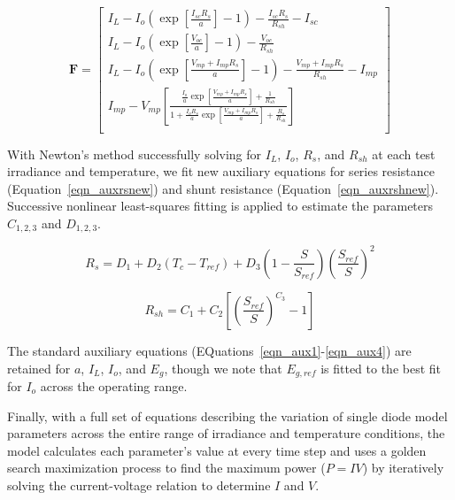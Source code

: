 \documentclass[12pt,letterpaper]{article}
\begin{document}
\begin{equation}
\mathbf{F} = \left[ \begin{array}{l} 
I_L - I_o\left(\exp\left[\frac{I_{sc}R_s}{a}\right]-1\right) - \frac{I_{sc}R_s}{R_{sh}} - I_{sc} \\ 

I_L - I_o\left(\exp \left[\frac{V_{oc}}{a}\right]-1\right) - \frac{V_{oc}}{R_{sh}} \\ 

I_L - I_o\left(\exp \left[\frac{V_{mp}+I_{mp}R_s}{a}\right]-1\right) - \frac{V_{mp}+I_{mp}R_s}{R_{sh}} - I_{mp} \\

I_{mp} - V_{mp}\left[ \frac{  \frac{I_o}{a}\exp\left[ \frac{V_{mp} + I_{mp}R_s}{a}\right] + \frac{1}{R_{sh}} } { 1  + \frac{I_o R_s}{a}\exp \left[ \frac{V_{mp} + I_{mp}R_s}{a}\right] + \frac{R_s}{R_{sh}} } \right] \\
\end{array} \right]
\end{equation}

With Newton's method successfully solving for $I_L$, $I_o$, $R_s$, and $R_{sh}$ at each test irradiance and temperature, we fit new auxiliary equations for series resistance (Equation~\ref{eqn_auxrsnew}) and shunt resistance (Equation~\ref{eqn_auxrshnew}).  Successive nonlinear least-squares fitting is applied to estimate the parameters $C_{1,2,3}$ and $D_{1,2,3}$.

\begin{equation}\label{eqn_auxrsnew}
R_s = D_1 + D_2(T_c-T_{ref}) + D_3\left( 1-\frac{S}{S_{ref}}\right)\left(\frac{S_{ref}}{S}\right)^2
\end{equation}

\begin{equation}\label{eqn_auxrshnew}
R_{sh} = C_1 + C_2\left[ \left(\frac{S_{ref}}{S}\right)^{C_3}-1 \right]
\end{equation}

The standard auxiliary equations (EQuations~\ref{eqn_aux1}-\ref{eqn_aux4}) are retained for $a$, $I_L$, $I_o$, and $E_g$, though we note that $E_{g,ref}$ is fitted to the best fit for $I_o$ across the operating range.  

Finally, with a full set of equations describing the variation of single diode model parameters across the entire range of irradiance and temperature conditions, the model calculates each parameter's value at every time step and uses a golden search maximization process to find the maximum power ($P=IV$) by iteratively solving the current-voltage relation to determine $I$ and $V$.  
\end{document}
